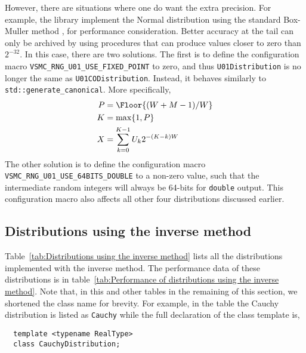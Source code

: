 However, there are situations where one do want the extra precision. For
example, the library implement the Normal distribution using the standard
Box-Muller method \parencite{Box:1958hv}, for performance consideration. Better
accuracy at the tail can only be archived by using procedures that can produce
values closer to zero than $2^{-32}$. In this case, there are two solutions.
The first is to define the configuration macro
\verb|VSMC_RNG_U01_USE_FIXED_POINT| to zero, and thus \verb|U01Distribution| is
no longer the same as \verb|U01CODistribution|. Instead, it behaves similarly
to \verb|std::generate_canonical|. More specifically,
\begin{align*}
  P &= \Floor{(W + M - 1) / W} \\
  K &= \max\{1, P\} \\
  X &= \sum_{k=0}^{K - 1} U_k 2^{-(K - k)W}
\end{align*}
The other solution is to define the configuration macro
\verb|VSMC_RNG_U01_USE_64BITS_DOUBLE| to a non-zero value, such that the
intermediate random integers will always be 64-bits for \verb|double| output.
This configuration macro also affects all other four distributions discussed
earlier.

\subsection{Distributions using the inverse method}
\label{sub:Distributions using the inverse method}

Table~\ref{tab:Distributions using the inverse method} lists all the
distributions implemented with the inverse method. The performance data of
these distributions is in table~\ref{tab:Performance of distributions using the
  inverse method}. Note that, in this and other tables in the remaining of this
section, we shortened the class name for brevity. For example, in the table the
Cauchy distribution is listed as \verb|Cauchy| while the full declaration of
the class template is,
\begin{Verbatim}
  template <typename RealType>
  class CauchyDistribution;
\end{Verbatim}

